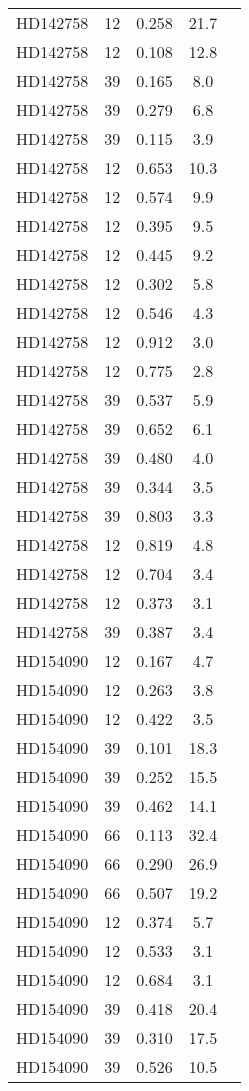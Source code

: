 \begin{table*}
\begin{tabular}{l c c c c}
HD142758 & 12 & 0.258 & 21.7\\ 
HD142758 & 12 & 0.108 & 12.8\\ 
HD142758 & 39 & 0.165 & 8.0\\ 
HD142758 & 39 & 0.279 & 6.8\\ 
HD142758 & 39 & 0.115 & 3.9\\ 
HD142758 & 12 & 0.653 & 10.3\\ 
HD142758 & 12 & 0.574 & 9.9\\ 
HD142758 & 12 & 0.395 & 9.5\\ 
HD142758 & 12 & 0.445 & 9.2\\ 
HD142758 & 12 & 0.302 & 5.8\\ 
HD142758 & 12 & 0.546 & 4.3\\ 
HD142758 & 12 & 0.912 & 3.0\\ 
HD142758 & 12 & 0.775 & 2.8\\ 
HD142758 & 39 & 0.537 & 5.9\\ 
HD142758 & 39 & 0.652 & 6.1\\ 
HD142758 & 39 & 0.480 & 4.0\\ 
HD142758 & 39 & 0.344 & 3.5\\ 
HD142758 & 39 & 0.803 & 3.3\\ 
HD142758 & 12 & 0.819 & 4.8\\ 
HD142758 & 12 & 0.704 & 3.4\\ 
HD142758 & 12 & 0.373 & 3.1\\ 
HD142758 & 39 & 0.387 & 3.4\\ 
\hline
HD154090 & 12 & 0.167 & 4.7\\ 
HD154090 & 12 & 0.263 & 3.8\\ 
HD154090 & 12 & 0.422 & 3.5\\ 
HD154090 & 39 & 0.101 & 18.3\\ 
HD154090 & 39 & 0.252 & 15.5\\ 
HD154090 & 39 & 0.462 & 14.1\\ 
HD154090 & 66 & 0.113 & 32.4\\ 
HD154090 & 66 & 0.290 & 26.9\\ 
HD154090 & 66 & 0.507 & 19.2\\ 
HD154090 & 12 & 0.374 & 5.7\\ 
HD154090 & 12 & 0.533 & 3.1\\ 
HD154090 & 12 & 0.684 & 3.1\\ 
HD154090 & 39 & 0.418 & 20.4\\ 
HD154090 & 39 & 0.310 & 17.5\\ 
HD154090 & 39 & 0.526 & 10.5\\ 

\end{tabular}
\end{table*}
